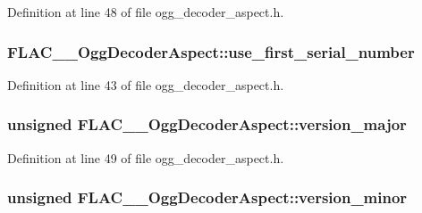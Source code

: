 Definition at line 48 of file ogg\+\_\+decoder\+\_\+aspect.\+h.

\subsubsection[{\texorpdfstring{use\+\_\+first\+\_\+serial\+\_\+number}{use_first_serial_number}}]{ F\+L\+A\+C\+\_\+\+\_\+\+Ogg\+Decoder\+Aspect\+::use\+\_\+first\+\_\+serial\+\_\+number}\hypertarget{struct_f_l_a_c_____ogg_decoder_aspect_a02f8d84efea668ff0e8fb692283a954b}{}\label{struct_f_l_a_c_____ogg_decoder_aspect_a02f8d84efea668ff0e8fb692283a954b}


Definition at line 43 of file ogg\+\_\+decoder\+\_\+aspect.\+h.

\subsubsection[{\texorpdfstring{version\+\_\+major}{version_major}}]{\setlength{\rightskip}{0pt plus 5cm}unsigned F\+L\+A\+C\+\_\+\+\_\+\+Ogg\+Decoder\+Aspect\+::version\+\_\+major}\hypertarget{struct_f_l_a_c_____ogg_decoder_aspect_ae8f1e533b602dbc6ebe5c1c6be63c901}{}\label{struct_f_l_a_c_____ogg_decoder_aspect_ae8f1e533b602dbc6ebe5c1c6be63c901}


Definition at line 49 of file ogg\+\_\+decoder\+\_\+aspect.\+h.

\subsubsection[{\texorpdfstring{version\+\_\+minor}{version_minor}}]{\setlength{\rightskip}{0pt plus 5cm}unsigned F\+L\+A\+C\+\_\+\+\_\+\+Ogg\+Decoder\+Aspect\+::version\+\_\+minor}\hypertarget{struct_f_l_a_c_____ogg_decoder_aspect_a69fcaf27fd0fc159ad6bf62c8ab3633e}{}\label{struct_f_l_a_c_____ogg_decoder_aspect_a69fcaf27fd0fc159ad6bf62c8ab3633e}


